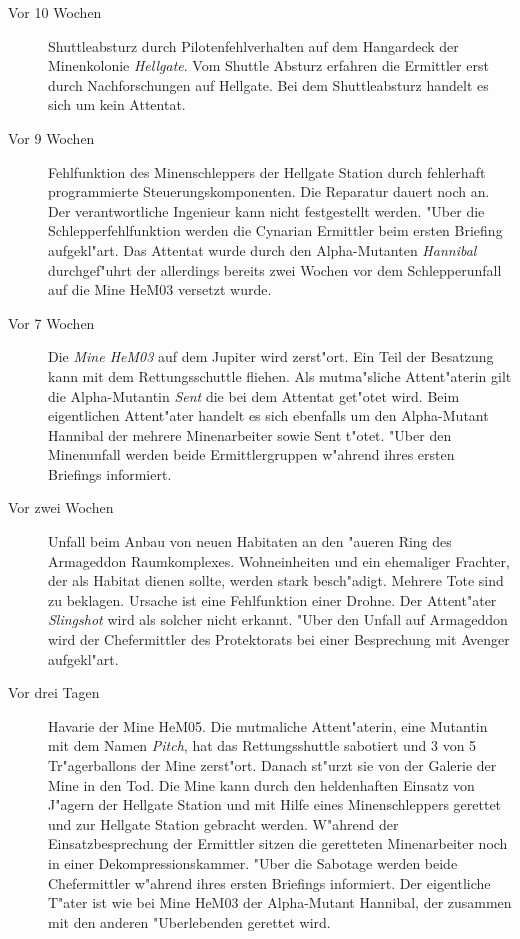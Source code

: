 \begin{description}
\item [Vor 10 Wochen] Shuttleabsturz durch Pilotenfehlverhalten auf dem Hangardeck der Minenkolonie \emph{Hellgate}. Vom Shuttle Absturz 
      erfahren die Ermittler erst durch Nachforschungen auf Hellgate. Bei dem Shuttleabsturz handelt es sich um kein Attentat.
\item [Vor 9 Wochen] Fehlfunktion des Minenschleppers der Hellgate Station durch fehlerhaft programmierte Steuerungskomponenten. Die 
      Reparatur dauert noch an. Der verantwortliche Ingenieur kann nicht festgestellt werden. "Uber die Schlepperfehlfunktion werden die Cynarian Ermittler beim ersten Briefing aufgekl"art. Das Attentat wurde durch den Alpha-Mutanten \emph{Hannibal} durchgef"uhrt der allerdings bereits zwei Wochen vor dem Schlepperunfall auf die Mine HeM03 versetzt wurde.      
\item [Vor 7 Wochen] Die \emph{Mine HeM03} auf dem Jupiter wird zerst"ort. Ein Teil der Besatzung kann mit dem  Rettungsschuttle fliehen. 
      Als mutma"sliche Attent"aterin gilt die Alpha-Mutantin \emph{Sent} die bei dem Attentat get"otet wird. Beim eigentlichen Attent"ater handelt es sich ebenfalls um den Alpha-Mutant Hannibal der mehrere Minenarbeiter sowie Sent t"otet. "Uber den Minenunfall werden beide Ermittlergruppen w"ahrend ihres ersten Briefings informiert.
\item [Vor zwei Wochen] Unfall beim Anbau von neuen Habitaten an den "au\3eren Ring des Armageddon Raumkomplexes. Wohneinheiten und ein
      ehemaliger Frachter, der als Habitat dienen sollte, werden stark besch"adigt.  Mehrere Tote sind zu beklagen. Ursache ist eine Fehlfunktion einer Drohne. Der Attent"ater \emph{Slingshot} wird als solcher nicht erkannt. "Uber den Unfall auf Armageddon wird der Chefermittler des Protektorats bei einer Besprechung mit Avenger aufgekl"art.
\item [Vor drei Tagen] Havarie der Mine HeM05. Die mutma\3liche Attent"aterin, eine Mutantin mit dem Namen \emph{Pitch}, hat das
      Rettungsshuttle sabotiert und 3 von 5 Tr"agerballons der Mine zerst"ort. Danach st"urzt sie von der Galerie der Mine in den Tod. Die Mine kann durch den heldenhaften Einsatz von J"agern der Hellgate Station und mit Hilfe eines Minenschleppers gerettet und zur Hellgate Station gebracht werden. W"ahrend der Einsatzbesprechung der Ermittler sitzen die geretteten Minenarbeiter noch in einer Dekompressionskammer. "Uber die Sabotage werden beide Chefermittler w"ahrend ihres ersten Briefings informiert. Der eigentliche
      T"ater ist wie bei Mine HeM03 der Alpha-Mutant Hannibal, der zusammen mit den anderen "Uberlebenden gerettet wird.
\end{description}
